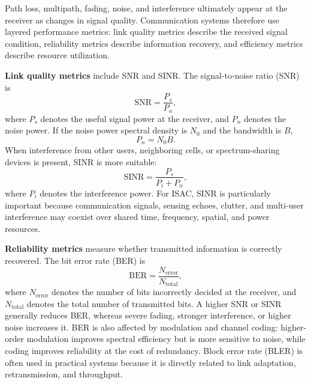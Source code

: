 
Path loss, multipath, fading, noise, and interference ultimately appear at the
receiver as changes in signal quality.
Communication systems therefore use layered performance metrics: link quality
metrics describe the received signal condition, reliability metrics describe
information recovery, and efficiency metrics describe resource utilization.

\textbf{Link quality metrics} include SNR and SINR.
The signal-to-noise ratio (SNR) is
\begin{equation}
    \mathrm{SNR}
    =
    \frac{P_s}{P_n},
    \label{eq:snr-definition}
\end{equation}
where
\(P_s\) denotes the useful signal power at the receiver,
and \(P_n\) denotes the noise power.
If the noise power spectral density is \(N_0\) and the bandwidth is \(B\),
\begin{equation}
    P_n
    =
    N_0 B.
    \label{eq:noise-power-bandwidth}
\end{equation}
When interference from other users, neighboring cells, or spectrum-sharing
devices is present, SINR is more suitable:
\begin{equation}
    \mathrm{SINR}
    =
    \frac{P_s}{P_i + P_n},
    \label{eq:sinr-definition}
\end{equation}
where
\(P_i\) denotes the interference power.
For ISAC, SINR is particularly important because communication signals, sensing
echoes, clutter, and multi-user interference may coexist over shared time,
frequency, spatial, and power resources.

\textbf{Reliability metrics} measure whether transmitted information is
correctly recovered.
The bit error rate (BER) is
\begin{equation}
    \mathrm{BER}
    =
    \frac{N_{\mathrm{error}}}{N_{\mathrm{total}}},
    \label{eq:ber-definition}
\end{equation}
where
\(N_{\mathrm{error}}\) denotes the number of bits incorrectly decided at the receiver,
and \(N_{\mathrm{total}}\) denotes the total number of transmitted bits.
A higher SNR or SINR generally reduces BER, whereas severe fading, stronger
interference, or higher noise increases it.
BER is also affected by modulation and channel coding: higher-order modulation
improves spectral efficiency but is more sensitive to noise, while coding
improves reliability at the cost of redundancy.
Block error rate (BLER) is often used in practical systems because it is
directly related to link adaptation, retransmission, and throughput.

